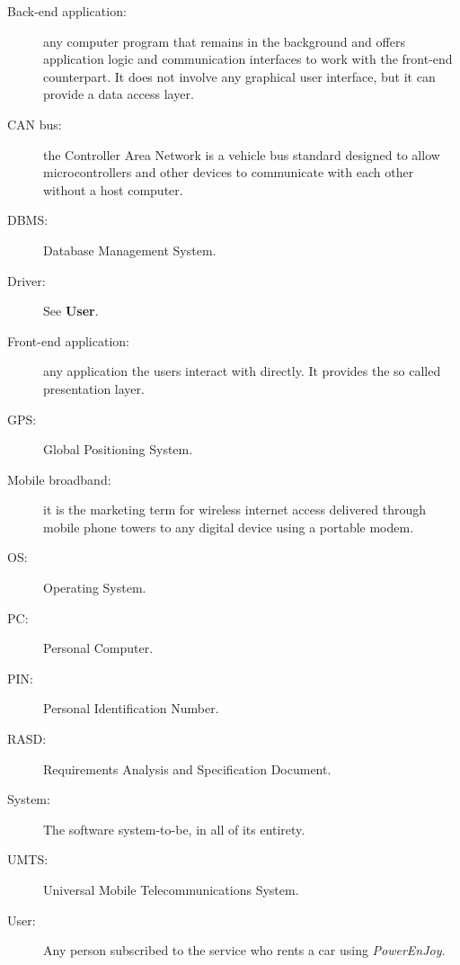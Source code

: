 \begin{description}
\item[Back-end application:] any computer program that remains in the background and offers application logic and communication interfaces to work with the front-end counterpart. It does not involve any graphical user interface, but it can provide a data access layer.
\item[CAN bus:] the Controller Area Network is a vehicle bus standard designed to allow microcontrollers and other devices to communicate with each other without a host computer.
\item[DBMS:] Database Management System.
\item[Driver:] See \textbf{User}.
\item[Front-end application:] any application the users interact with directly. It provides the so called presentation layer.
\item[GPS:] Global Positioning System.
\item[Mobile broadband:] it is the marketing term for wireless internet access delivered through mobile phone towers to any digital device using a portable modem.
\item[OS:] Operating System.
\item[PC:] Personal Computer.
\item[PIN:] Personal Identification Number.
\item[RASD:] Requirements Analysis and Specification Document.
\item[System:] The software system-to-be, in all of its entirety.
\item[UMTS:] Universal Mobile Telecommunications System.
\item[User:] Any person subscribed to the service who rents a car using \hbox{\emph{PowerEnJoy}}.
\end{description}

